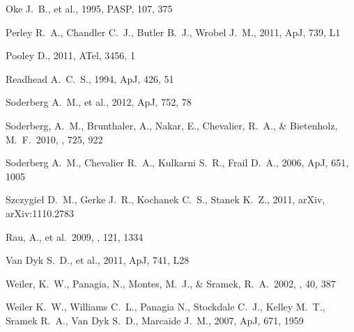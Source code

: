 \documentclass{emulateapj}
\begin{document}
\begin{thebibliography}{}
Oke J.~B., et al., 1995, PASP, 107, 375 

Perley R.~A., Chandler C.~J., Butler B.~J., Wrobel J.~M., 2011, ApJ, 739, 
L1 

 Pooley 
D., 2011, ATel, 3456, 1 

Readhead A.~C.~S., 1994, ApJ, 426, 51

 Soderberg A.~M., et al., 2012, ApJ, 752, 
78 

 Soderberg, A.~M., 
Brunthaler, A., Nakar, E., Chevalier, R.~A., 
\& Bietenholz, M.~F.\ 2010, \apj, 725, 922 

 Soderberg A.~M., Chevalier R.~A., Kulkarni 
S.~R., Frail D.~A., 2006, ApJ, 651, 1005 

 Szczygie{\l} D.~M., Gerke J.~R., Kochanek 
C.~S., Stanek K.~Z., 2011, arXiv, arXiv:1110.2783 

 Rau, A., et al.\ 2009, 
\pasp, 121, 1334 

 Van Dyk S.~D., et al., 2011, ApJ,
741, L28 



 Weiler, K.~W., Panagia, N., Montes, M.~J., \& Sramek, R.~A.\ 2002, \araa, 40, 387 

Weiler K.~W., Williams C.~L., Panagia N., Stockdale C.~J., Kelley M.~T., 
Sramek R.~A., Van Dyk S.~D., Marcaide J.~M., 2007, ApJ, 671, 1959


\end{thebibliography}{}
\end{document}

